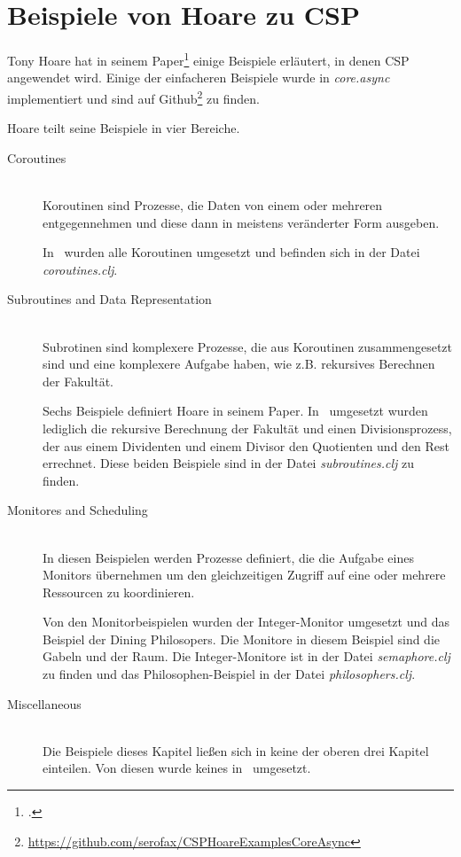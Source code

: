 \section{Beispiele von Hoare zu \acs{CSP}}
Tony Hoare hat in seinem Paper\footcite{CSP} einige Beispiele erläutert, in denen \ac{CSP} angewendet wird. Einige der einfacheren Beispiele wurde in \textit{core.async} implementiert und sind auf Github\footnote{\url{https://github.com/serofax/CSPHoareExamplesCoreAsync}} zu finden.

Hoare teilt seine Beispiele in vier Bereiche. 

\begin{description}
\item[Coroutines]\hfill \\
Koroutinen sind Prozesse, die Daten von einem oder mehreren entgegennehmen und diese dann in meistens veränderter Form ausgeben.

In \CA\ wurden alle Koroutinen umgesetzt und befinden sich in der Datei \textit{coroutines.clj}.
\item[Subroutines and Data Representation]\hfill \\
Subrotinen sind komplexere Prozesse, die aus Koroutinen zusammengesetzt sind und eine komplexere Aufgabe haben, wie z.B. rekursives Berechnen der Fakultät.

Sechs Beispiele definiert Hoare in seinem Paper. In \CA\ umgesetzt wurden lediglich die rekursive Berechnung der Fakultät und einen Divisionsprozess, der aus einem Dividenten und einem Divisor den Quotienten und den Rest errechnet. Diese beiden Beispiele sind in der Datei \textit{subroutines.clj} zu finden.
\item[Monitores and Scheduling] \hfill \\
In diesen Beispielen werden Prozesse definiert, die die Aufgabe eines Monitors übernehmen um den gleichzeitigen Zugriff auf eine oder mehrere Ressourcen zu koordinieren.

Von den Monitorbeispielen wurden der Integer-Monitor umgesetzt und das Beispiel der Dining Philosopers. Die Monitore in diesem Beispiel sind die Gabeln und der Raum. Die Integer-Monitore ist in der Datei \textit{semaphore.clj} zu finden und das Philosophen-Beispiel in der Datei \textit{philosophers.clj}.
\item[Miscellaneous] \hfill \\
Die Beispiele dieses Kapitel ließen sich in keine der oberen drei Kapitel einteilen. Von diesen wurde keines in \CA\ umgesetzt.
\end{description}




